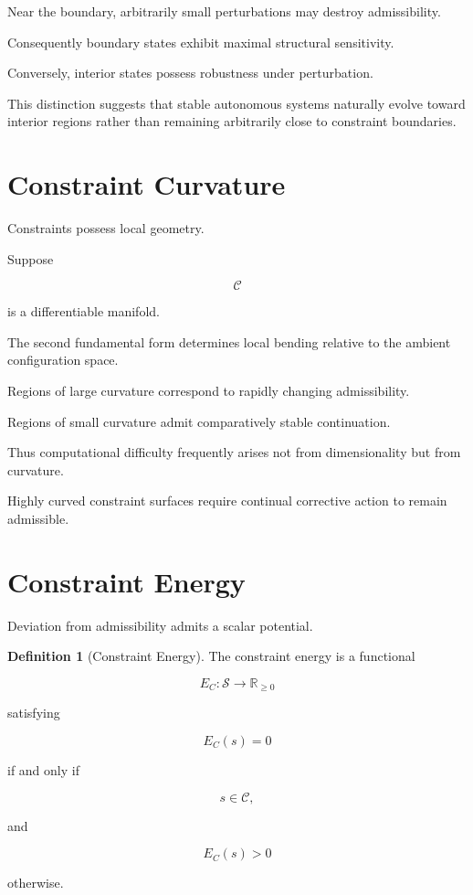 \documentclass[11pt,oneside]{book}
\numberwithin{equation}{chapter}
\theoremstyle{definition}
\newtheorem{definition}{Definition}[chapter]
\theoremstyle{plain}
\begin{document}
Near the boundary, arbitrarily small perturbations may destroy admissibility.

Consequently boundary states exhibit maximal structural sensitivity.

Conversely, interior states possess robustness under perturbation.

This distinction suggests that stable autonomous systems naturally evolve
toward interior regions rather than remaining arbitrarily close to constraint
boundaries.

\section{Constraint Curvature}

Constraints possess local geometry.

Suppose

\[
\mathcal{C}
\]

is a differentiable manifold.

The second fundamental form determines local bending relative to the ambient
configuration space.

Regions of large curvature correspond to rapidly changing admissibility.

Regions of small curvature admit comparatively stable continuation.

Thus computational difficulty frequently arises not from dimensionality but
from curvature.

Highly curved constraint surfaces require continual corrective action to
remain admissible.

\section{Constraint Energy}

Deviation from admissibility admits a scalar potential.

\begin{definition}[Constraint Energy]

The constraint energy is a functional

\[
E_C:
\mathcal{S}
\rightarrow
\mathbb{R}_{\ge0}
\]

satisfying

\[
E_C(s)=0
\]

if and only if

\[
s\in\mathcal{C},
\]

and

\[
E_C(s)>0
\]

otherwise.

\end{definition}
\end{document}
